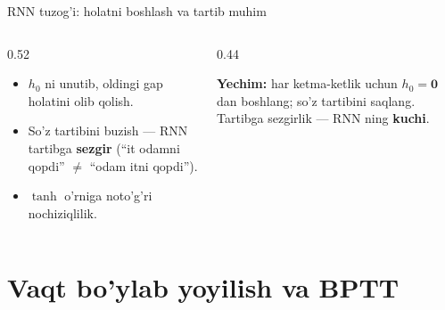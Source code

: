 \documentclass[aspectratio=169,11pt]{beamer}
\begin{document}
\begin{frame}{RNN tuzog'i: holatni boshlash va tartib muhim}
  \begin{columns}[T]
    \begin{column}{0.52\textwidth}
      \begin{tcolorbox}[warnbox,title=Keng tarqalgan xatolar]
        \small
        \begin{itemize}\setlength\itemsep{2pt}
          \item $h_0$ ni unutib, oldingi gap holatini olib qolish.
          \item So'z tartibini buzish --- RNN tartibga \textbf{sezgir}
                (``it odamni qopdi'' $\neq$ ``odam itni qopdi'').
          \item $\tanh$ o'rniga noto'g'ri nochiziqlilik.
        \end{itemize}
      \end{tcolorbox}
    \end{column}
    \begin{column}{0.44\textwidth}
      \begin{tcolorbox}[okbox,top=2pt,bottom=2pt]
        \footnotesize
        \textbf{Yechim:} har ketma-ketlik uchun $h_0=\mathbf{0}$ dan boshlang;
        so'z tartibini saqlang. Tartibga sezgirlik --- RNN ning \textbf{kuchi}.
      \end{tcolorbox}
    \end{column}
  \end{columns}
\end{frame}

\section[Yoyilish]{Vaqt bo'ylab yoyilish va BPTT}
\end{document}
